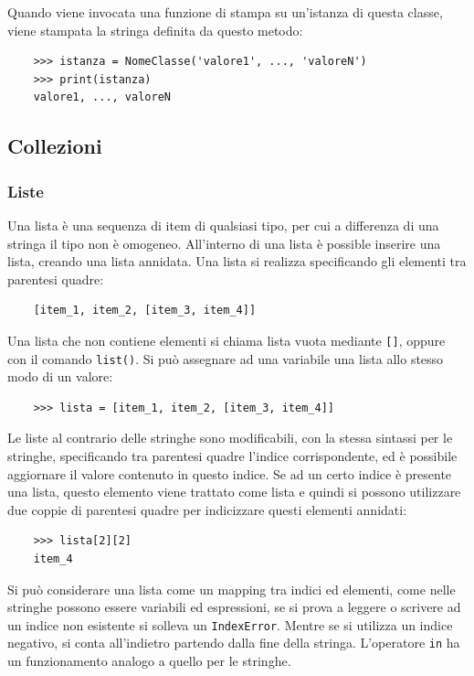 \documentclass{article}
\numberwithin{equation}{subsection}
\begin{document}
Quando viene invocata una funzione di stampa su un'istanza di questa classe, viene stampata la stringa definita da questo 
metodo:
\begin{verbatim}
    >>> istanza = NomeClasse('valore1', ..., 'valoreN')
    >>> print(istanza)
    valore1, ..., valoreN
\end{verbatim}


\subsection{Collezioni}

\subsubsection{Liste}

Una lista è una sequenza di item di qualsiasi tipo, per cui a differenza di una stringa il tipo non è omogeneo. All'interno di una lista è possible 
inserire una lista, creando una lista annidata.  
Una lista si realizza specificando gli elementi tra parentesi quadre:
\begin{verbatim}
    [item_1, item_2, [item_3, item_4]]
\end{verbatim}

Una lista che non contiene elementi si chiama lista vuota mediante \verb|[]|, oppure con il comando \verb|list()|. Si può assegnare ad una variabile una lista allo 
stesso modo di un valore:
\begin{verbatim}
    >>> lista = [item_1, item_2, [item_3, item_4]]
\end{verbatim}

Le liste al contrario delle stringhe sono modificabili, con la stessa sintassi per le stringhe, specificando tra parentesi quadre l'indice corrispondente, ed è possibile 
aggiornare il valore contenuto in questo indice. Se ad un certo indice è presente una lista, questo elemento viene trattato come lista e quindi si possono utilizzare 
due coppie di parentesi quadre per indicizzare questi elementi annidati:
\begin{verbatim}
    >>> lista[2][2]
    item_4
\end{verbatim}
Si può considerare una lista come un mapping tra indici ed elementi, come nelle stringhe possono essere variabili ed espressioni, se si prova a leggere o scrivere 
ad un indice non esistente si solleva un \verb|IndexError|. Mentre se si utilizza un indice negativo, si conta all'indietro partendo dalla fine della stringa. 
L'operatore \verb|in| ha un funzionamento analogo a quello per le stringhe. 
\end{document}
